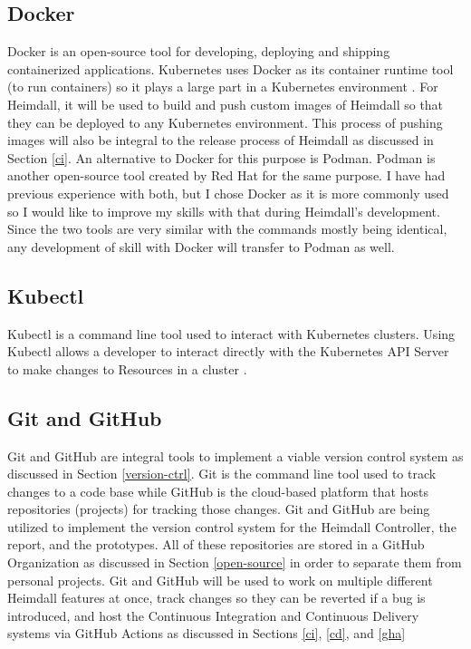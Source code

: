 \documentclass{article}
\begin{document}
 
\subsection{Docker}

Docker is an open-source tool for developing, deploying and shipping containerized applications. Kubernetes uses Docker as its container runtime tool (to run containers) so it plays a large part in a Kubernetes environment \cite{docker-overview}. For Heimdall, it will be used to build and push  custom images of Heimdall so that they can be deployed to any Kubernetes environment. This process of pushing images will also be integral to the release process of Heimdall as discussed in Section \ref{ci}. An alternative to Docker for this purpose is Podman. Podman is another open-source tool created by Red Hat for the same purpose. I have had previous experience with both, but I chose Docker as it is more commonly used so I would like to improve my skills with that during Heimdall's development. Since the two tools are very similar with the commands mostly being identical, any development of skill with Docker will transfer to Podman as well.


\subsection{Kubectl}

Kubectl is a command line tool used to interact with Kubernetes clusters. Using Kubectl allows a developer to interact directly with the Kubernetes API Server to make changes to Resources in a cluster \cite{k8s-tools}.



\subsection{Git and GitHub}

Git and GitHub are integral tools to implement a viable version control system as discussed in Section \ref{version-ctrl}. Git is the command line tool used to track changes to a code base while GitHub is the cloud-based platform that hosts repositories (projects) for tracking those changes. Git and GitHub are being utilized to implement the version control system for the Heimdall Controller, the report, and the prototypes. All of these repositories are stored in a GitHub Organization as discussed in Section \ref{open-source} in order to separate them from personal projects. Git and GitHub will be used to work on multiple different Heimdall features at once, track changes so they can be reverted if a bug is introduced, and host the Continuous Integration and Continuous Delivery systems via GitHub Actions as discussed in Sections \ref{ci}, \ref{cd}, and \ref{gha}
\end{document}
